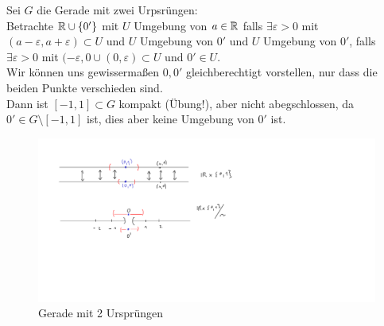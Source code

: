 \begin{example}
    Sei $G$ die Gerade mit zwei Urpsrüngen: \\
    Betrachte  $\mathbb{R}\cup \left \{0'\right\} $ mit $U$ Umgebung von  $a\in \mathbb{R}$ falls $\exists ε>0$ mit $(a-ε, a+ε)\subset U$ und $U$ Umgebung von  $0'$ und  $U$ Umgebung von  $0'$, falls  $\exists ε>0$ mit $(-ε,0 \cup (0,ε) \subset U$ und $0' \in U$. \\
    Wir können uns gewissermaßen  $0,0'$ gleichberechtigt vorstellen, nur dass die beiden Punkte verschieden sind. \\
    Dann ist  $[-1,1] \subset G$ kompakt (Übung!), aber nicht abegschlossen, da $0' \in G \setminus [-1,1]$ ist, dies aber keine Umgebung von $0'$ ist.
    \begin{figure}[H]
        \includegraphics[scale=0.4]{figures/line-with-2-origins.pdf}
    \caption{Gerade mit 2 Ursprüngen}
    \end{figure}
\end{example}


